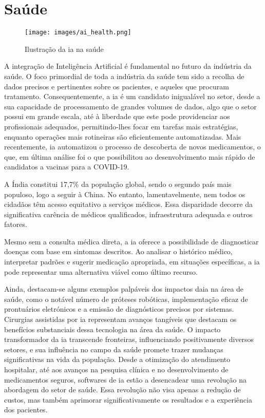\documentclass[a4paper, 11pt, onecolumn, oneside]{report}
\begin{document}
\section{Saúde}
%
\begin{wrapfigure}{l}{0.5\textwidth}
    \texttt{[image: images/ai\_health.png]}
    \caption{Ilustração da \ac{ia} na saúde\cite{i32}}
    \vspace{4mm}
    \label{ai_health}
\end{wrapfigure}
%
A integração de Inteligência Artificial é fundamental no futuro da indústria da saúde. O foco primordial de toda a indústria da saúde tem sido a recolha de dados precisos e pertinentes sobre os pacientes, e aqueles que procuram tratamento. Consequentemente, a \ac{ia}  é um candidato inigualável no setor, desde a sua capacidade de processamento de grandes volumes de dados, algo que o setor possui em grande escala, até à liberdade que este pode providenciar aos profissionais adequados, permitindo-lhes focar em tarefas mais estratégias, enquanto operações mais rotineiras são eficientemente automatizadas. Mais recentemente, \ac{ia} automatizou o processo de descoberta de novos medicamentos, o que, em última análise foi o que possibilitou ao desenvolvimento mais rápido de candidatos a vacinas para a COVID-19.
\par
A Índia constitui 17,7\% da população global, sendo o segundo país mais populoso, logo a seguir à China. No entanto, lamentavelmente, nem todos os cidadãos têm acesso equitativo a serviços médicos. Essa disparidade decorre da significativa carência de médicos qualificados, infraestrutura adequada e outros fatores.
\par
Mesmo sem a consulta médica direta, a \ac{ia} oferece a possibilidade de diagnosticar doenças com base em sintomas descritos. Ao analisar o histórico médico, interpretar padrões e sugerir medicação apropriada, em situações específicas, a \ac{ia} pode representar uma alternativa viável como último recurso.
\par 
Ainda, destacam-se alguns exemplos palpáveis dos impactos da\ac{ia} na área de saúde, como o notável número de próteses robóticas, implementação eficaz de prontuários eletrónicos e a emissão de diagnósticos precisos por sistemas. Cirurgias assistidas por \ac{ia} representam avanços tangíveis que destacam os benefícios substanciais dessa tecnologia na área da saúde. O impacto transformador da \ac{ia} transcende fronteiras, influenciando positivamente diversos setores, e sua influência no campo da saúde promete trazer mudanças significativas na vida da população. Desde a otimização do atendimento hospitalar, até aos avanços na pesquisa clínica e no desenvolvimento de medicamentos seguros, softwares de \ac{ia} estão a desencadear uma revolução na abordagem do setor de saúde. Essa revolução não visa apenas a redução de custos, mas também aprimorar significativamente os resultados e a experiência dos pacientes.
\end{document}
